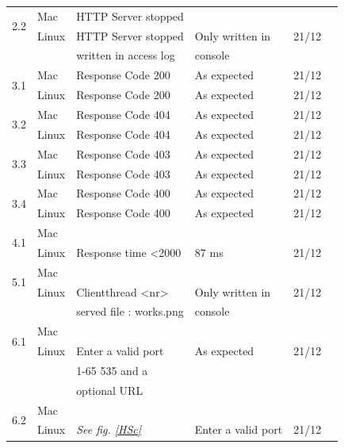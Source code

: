 \documentclass[a4paper, 12pt]{article}
\newcommand{\cmark}{\ding{51}}%
\newcommand{\xmark}{\ding{55}}%
\begin{document}
\begin{tabular}{| c | l | l | l | l | c |}
\multirow{2}{*}{2.2}	& Mac		& HTTP Server stopped	&								&					&				\\ \cline{2-6}
							& Linux		& HTTP Server stopped	& Only written in		&	21/12		& \xmark			\\ 
							&				& written in access log	&	console					& 					& \\ \hline
\multirow{2}{*}{3.1}	& Mac		& Response Code 200	& As expected 		& 21/12			& \cmark	\\ \cline{2-6}
							& Linux		& Response Code 200	& As expected 		& 21/12			& \cmark	\\ \hline
\multirow{2}{*}{3.2}	& Mac		& Response Code 404 	& As expected 		& 21/12			& \cmark	\\ \cline{2-6}
							& Linux		& Response Code 404	& As expected 		& 21/12			& \cmark	\\ \hline
\multirow{2}{*}{3.3}	& Mac		& Response Code 403	& As expected 		& 21/12			& \cmark	\\ \cline{2-6}
							& Linux		& Response Code 403	& As expected 		& 21/12			& \cmark	\\ \hline
\multirow{2}{*}{3.4}	& Mac		& Response Code 400	& As expected 		& 21/12			& \cmark	\\ \cline{2-6}
							& Linux		& Response Code 400	& As expected 		& 21/12			& \cmark	\\ \hline
\multirow{2}{*}{4.1}	& Mac		&									&							&					&				\\ \cline{2-6}
							& Linux		& Response time <2000	& 87 ms				& 21/12			& \cmark	\\ \hline
\multirow{2}{*}{5.1}	& Mac		&									&							&					&				\\ \cline{2-6}
							& Linux		& Clientthread <nr>		&	Only written in	&	21/12		& \xmark	\\
							&				& served file : works.png&	console				&					&				\\ \hline
\multirow{2}{*}{6.1}	& Mac		&									&							&					&				\\ \cline{2-6}
							& Linux		&	Enter a valid port 		&	As expected		& 21/12			& \cmark	\\
							&				& 1-65 535 and a 			&							&					&				\\
							&				&	optional URL				&							&					&				\\ \hline
\multirow{2}{*}{6.2}	& Mac		&									&							&					&				\\ \cline{2-6}
							& Linux		&\textit{See fig. \ref{HSc}}& Enter a valid port& 21/12		& \xmark	\\ 	

\end{tabular}
\end{document}
